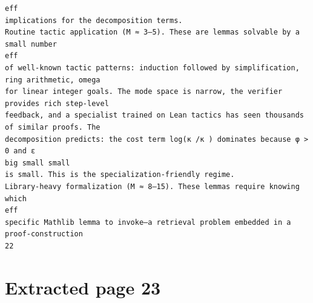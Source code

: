 \documentclass[11pt]{article}
\begin{document}
\begin{verbatim}
eff
implications for the decomposition terms.
Routine tactic application (M ≈ 3–5). These are lemmas solvable by a small number
eff
of well-known tactic patterns: induction followed by simplification, ring arithmetic, omega
for linear integer goals. The mode space is narrow, the verifier provides rich step-level
feedback, and a specialist trained on Lean tactics has seen thousands of similar proofs. The
decomposition predicts: the cost term log(κ /κ ) dominates because φ > 0 and ε
big small small
is small. This is the specialization-friendly regime.
Library-heavy formalization (M ≈ 8–15). These lemmas require knowing which
eff
specific Mathlib lemma to invoke—a retrieval problem embedded in a proof-construction
22
\end{verbatim}

\clearpage
\section*{Extracted page 23}
\end{document}
